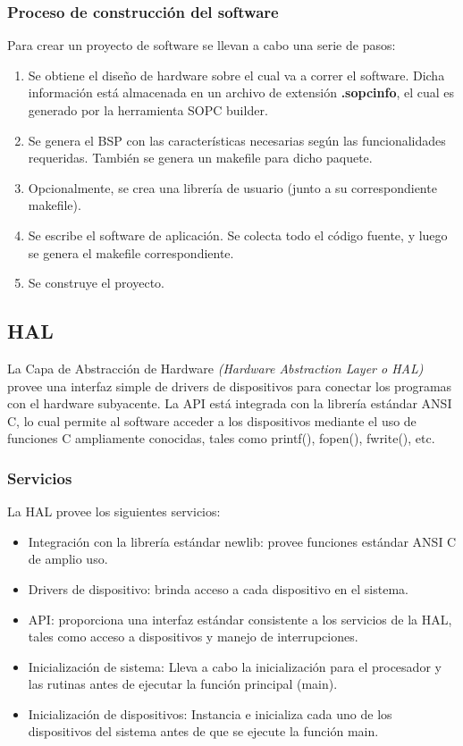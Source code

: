 \subsubsection*{Proceso de construcción del software}

Para crear un proyecto de software se llevan a cabo una serie de pasos:

\begin{enumerate}
	\item Se obtiene el diseño de hardware sobre el cual va a correr el software. Dicha información está almacenada en un archivo de extensión \textbf{.sopcinfo}, el cual es generado por la herramienta SOPC builder.
	\item Se genera el BSP con las características necesarias según las funcionalidades requeridas. También se genera un makefile para dicho paquete.
	\item Opcionalmente, se crea una librería de usuario (junto a su correspondiente makefile).
	\item Se escribe el software de aplicación. Se colecta todo el código fuente, y luego se genera el makefile correspondiente.
	\item Se construye el proyecto.
\end{enumerate}


\subsection *{HAL}

La Capa de Abstracción de Hardware \textit{(Hardware Abstraction Layer o HAL)} provee una interfaz simple de drivers de dispositivos para conectar los programas con el hardware subyacente. La API está integrada con la librería estándar ANSI C, lo cual permite al software acceder a los dispositivos mediante el uso de funciones C ampliamente conocidas, tales como printf(), fopen(), fwrite(), etc.

\subsubsection*{Servicios}

La HAL provee los siguientes servicios:

\begin{itemize}
	\item Integración con la librería estándar newlib: provee funciones estándar ANSI C de amplio uso.
	\item Drivers de dispositivo: brinda acceso a cada dispositivo en el sistema.
	\item API: proporciona una interfaz estándar consistente a los servicios de la HAL, tales como acceso a dispositivos y manejo de interrupciones.
	\item Inicialización de sistema: Lleva a cabo la inicialización para el procesador y las rutinas antes de ejecutar la función principal (main).
	\item Inicialización de dispositivos: Instancia e inicializa cada uno de los dispositivos del sistema antes de que se ejecute la función main.
\end{itemize}

